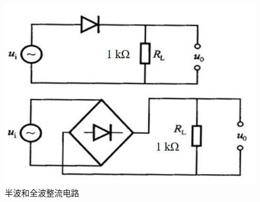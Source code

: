 \documentclass[UTF8]{ctexart}
\begin{document}
\begin{figure}[h!]
    \centering
    \includegraphics[scale=0.7]{半波和全波整流电路.PNG}
    \caption{半波和全波整流电路}
\end{figure}
\newpage
\end{document}
